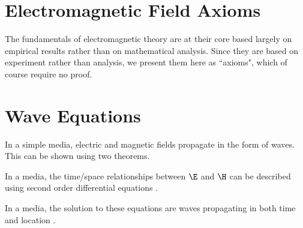\section{Electromagnetic Field Axioms}
The fundamentals of electromagnetic theory are at their core based
largely on empirical results rather than on mathematical analysis.
Since they are based on experiment rather than analysis,
we present them here as ``axioms", which of course require no proof.

\begin{axiom}
\label{ax:mf}
\end{axiom}

\begin{axiom}
\label{ax:ma}
\end{axiom}

\begin{axiom}
\label{ax:mgd}
\end{axiom}

\begin{axiom}
\label{ax:mgb}
\end{axiom}

\section{Wave Equations}
In a simple media, electric and magnetic fields propagate in the form of waves.
This can be shown using two theorems.
\begin{liste}
   \item In a  media,
         the time/space relationships between $\E$ and $\H$
         can be described using second order differential equations
        .
   \item In a  media,
         the solution to these equations are waves propagating in both time and location
        .
\end{liste}

